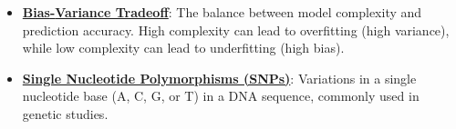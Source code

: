 \documentclass{article}%
\begin{document}
\begin{itemize}[leftmargin=*]
\item \href{https://purdue.brightspace.com/d2l/common/assets/pdfjs-d2l-dist/1.0.14-legacy/web/viewer.html?file=\%2Fcontent\%2Fenforced\%2F1095467-wl.202510.CS.24300.001\%2F11L2-svd-pca-recommender.pdf\%3Fou\%3D1095467\&lang=en-us\&container=d2l-fileviewer-rendered-pdf\&fullscreen=d2l-fileviewer-rendered-pdf-dialog\&height=667#page=53}{\textbf{Bias{-}Variance Tradeoff}}: The balance between model complexity and prediction accuracy. High complexity can lead to overfitting (high variance), while low complexity can lead to underfitting (high bias).%
\item \href{https://purdue.brightspace.com/d2l/common/assets/pdfjs-d2l-dist/1.0.14-legacy/web/viewer.html?file=\%2Fcontent\%2Fenforced\%2F1095467-wl.202510.CS.24300.001\%2F11L2-svd-pca-recommender.pdf\%3Fou\%3D1095467\&lang=en-us\&container=d2l-fileviewer-rendered-pdf\&fullscreen=d2l-fileviewer-rendered-pdf-dialog\&height=667#page=26}{\textbf{Single Nucleotide Polymorphisms (SNPs)}}: Variations in a single nucleotide base (A, C, G, or T) in a DNA sequence, commonly used in genetic studies.%
\end{itemize}%
\end{document}

